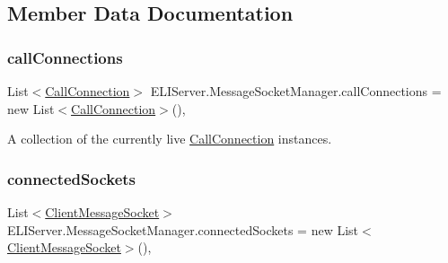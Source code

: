 \subsection{Member Data Documentation}
\mbox{\label{class_e_l_i_server_1_1_message_socket_manager_a1f25b676369fa4e59beca49d3ecf294a}} 
\subsubsection{\texorpdfstring{call\+Connections}{callConnections}}
{\footnotesize\ttfamily List$<$\hyperlink{class_e_l_i_server_1_1_call_connection}{Call\+Connection}$>$ E\+L\+I\+Server.\+Message\+Socket\+Manager.\+call\+Connections = new List$<$\hyperlink{class_e_l_i_server_1_1_call_connection}{Call\+Connection}$>$()\hspace{0.3cm}{\ttfamily [static]}, {\ttfamily [private]}}



A collection of the currently live \hyperlink{class_e_l_i_server_1_1_call_connection}{Call\+Connection} instances. 

\mbox{\label{class_e_l_i_server_1_1_message_socket_manager_a042e9dc087484feacc3128eb3f7ac2f4}} 
\subsubsection{\texorpdfstring{connected\+Sockets}{connectedSockets}}
{\footnotesize\ttfamily List$<$\hyperlink{class_e_l_i_server_1_1_messaging_1_1_client_message_socket}{Client\+Message\+Socket}$>$ E\+L\+I\+Server.\+Message\+Socket\+Manager.\+connected\+Sockets = new List$<$\hyperlink{class_e_l_i_server_1_1_messaging_1_1_client_message_socket}{Client\+Message\+Socket}$>$()\hspace{0.3cm}{\ttfamily [static]}, {\ttfamily [private]}}



